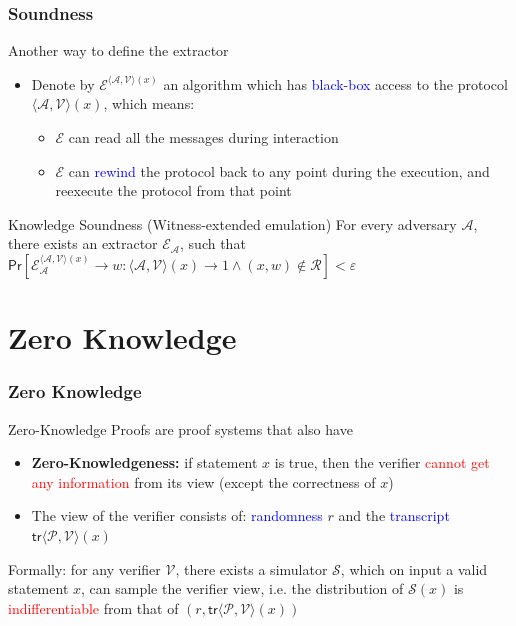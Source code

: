 \documentclass{beamer}
\newcommand{\blue}[1]{\textcolor{blue}{#1}}
\newcommand{\dgreen}[1]{\textcolor{dgreen}{#1}}
\newcommand{\red}[1]{\textcolor{red}{#1}}
\begin{document}
\frame
{
  \frametitle{Soundness}
  \onslide<+-> Another way to define the extractor
  \begin{itemize}
    \item<+->Denote by $\mathcal{E}^{\langle\mathcal{A},\mathcal{V}\rangle(x)}$ an algorithm which has \blue{black-box} access to the protocol $\langle\mathcal{A},\mathcal{V}\rangle(x)$, which means:
    \begin{itemize}
      \item $\mathcal{E}$ can read all the messages during interaction
      \item $\mathcal{E}$ can \blue{rewind} the protocol back to any point during the execution, and reexecute the protocol from that point
    \end{itemize}
  \end{itemize}
  \onslide<+->\begin{block}{Knowledge Soundness (Witness-extended emulation)}
  For every adversary $\mathcal{A}$, there exists an extractor $\mathcal{E}_{\mathcal{A}}$, such that $\mathsf{Pr}[\mathcal{E}_{\mathcal{A}}^{\langle\mathcal{A},\mathcal{V}\rangle(x)}\to w:\langle\mathcal{A},\mathcal{V}\rangle(x)\to 1 \wedge (x,w)\notin\mathcal{R}]<\varepsilon$
  \end{block}
}

\section{Zero Knowledge}
\frame
{
  \frametitle{Zero Knowledge}
  \onslide<+-> Zero-Knowledge Proofs are proof systems that also have
  \begin{itemize}
    \item<+-> \textbf{Zero-Knowledgeness:} if \dgreen{statement $x$ is true}, then the verifier \red{cannot get any information} from its view (except the correctness of $x$)
    \item<+-> The view of the verifier consists of: \blue{randomness} $r$ and the \blue{transcript} $\mathsf{tr}\langle\mathcal{P},\mathcal{V}\rangle(x)$
  \end{itemize}
  \onslide<+-> Formally: for any verifier $\mathcal{V}$, there exists a simulator $\mathcal{S}$, which on input a \dgreen{valid statement $x$}, can sample the verifier view, i.e. the distribution of $\mathcal{S}(x)$ is \red{indifferentiable} from that of $(r,\mathsf{tr}\langle\mathcal{P},\mathcal{V}\rangle(x))$
}
\end{document}
